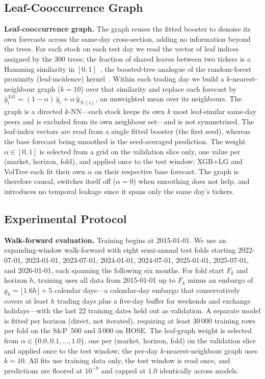 \documentclass[runningheads,a4paper]{llncs}
\begin{document}
\subsection{Leaf-Cooccurrence Graph}
\textbf{Leaf-cooccurrence graph.} The graph reuses the fitted booster to denoise its own forecasts across
the same-day cross-section, adding no information beyond the trees. For each stock on each test day we read
the vector of leaf indices assigned by the 300 trees; the fraction of shared leaves between two tickers is
a Hamming similarity in $[0,1]$~\cite{chen2016}, the boosted-tree analogue of the random-forest proximity
(leaf-incidence) kernel~\cite{rhodes2023}. Within each trading day we build a $k$-nearest-neighbour graph
($k=10$) over that similarity and replace each forecast by
$\hat y_i^{\,\mathrm{LG}}=(1-\alpha)\,\hat y_i+\alpha\,\overline{\hat y}_{\mathcal{N}(i)}$, an unweighted
mean over its neighbours. The graph is a directed $k$-NN---each stock keeps its own $k$ most leaf-similar
same-day peers and is excluded from its own neighbour set---and is not symmetrized. The leaf-index vectors
are read from a single fitted booster (the first seed), whereas the base forecast being smoothed is the
seed-averaged prediction. The weight $\alpha\in[0,1]$ is selected from a grid on the validation slice only,
one value per (market, horizon, fold), and applied once to the test window; XGB+LG and VolTree each fit
their own $\alpha$ on their respective base forecast. The graph is therefore causal, switches itself off
($\alpha=0$) when smoothing does not help, and introduces no temporal leakage since it spans only the same
day's tickers.

\subsection{Experimental Protocol}
\textbf{Walk-forward evaluation.} Training begins at 2015-01-01. We use an expanding-window walk-forward
with eight semi-annual test folds starting 2022-07-01, 2023-01-01, 2023-07-01, 2024-01-01, 2024-07-01,
2025-01-01, 2025-07-01, and 2026-01-01, each spanning the following six months. For fold start $F_k$ and
horizon $h$, training uses all data from 2015-01-01 up to $F_k$ minus an embargo of
$g_h=\lfloor 1.6h\rfloor+5$ calendar days---a calendar-day embargo that conservatively covers at least $h$
trading days plus a five-day buffer for weekends and exchange holidays---with the last 22 training dates
held out as validation. A
separate model is fitted per horizon (direct, not iterated), requiring at least 30\,000 training rows per
fold on the S\&P~500 and 3\,000 on HOSE. The leaf-graph weight is selected from
$\alpha\in\{0.0,0.1,\dots,1.0\}$, one per (market, horizon, fold) on the validation slice and applied once
to the test window; the per-day $k$-nearest-neighbour graph uses $k=10$. All fits use training data only,
the test window is read once, and predictions are floored at $10^{-8}$ and capped at $1.0$ identically
across models.
\end{document}
